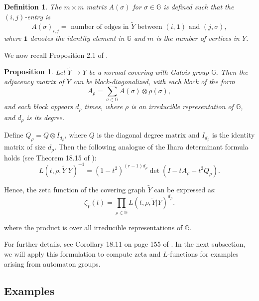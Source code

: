 \documentclass{article}
\newtheorem{mydef}{Definition}[section]
\newtheorem{mypro}{Proposition}[section]
\newcommand{\gid}{\mathbf{1}}
\newcommand{\Gal}{\mathbb{G}}
\newcommand{\Y}{\widetilde{Y}}
\begin{document}
\medskip
\begin{mydef} The $m \times m$ matrix $A(\sigma)$ for $\sigma \in \Gal$ is defined such that the $(i,j)$-entry is
\begin{equation}
A(\sigma)_{i,j} = \text{ number of edges in } \Y \text{ between } (i, \gid) \text{ and } (j, \sigma),
\label{Equation:sheet1toandother}
\end{equation}
where $\gid$ denotes the identity element in $\Gal$ and $m$ is the number of vertices in $Y$. \end{mydef}

\medskip
We now recall Proposition 2.1 of \cite{dedeo2005zeta}.

\begin{mypro} \label{block-diagonalization} Let $\Y \to Y$ be a normal covering with Galois group $\Gal$. Then the adjacency matrix of $\Y$ can be block-diagonalized, with each block of the form
\begin{equation}
A_{\rho} = \sum_{\sigma \in \Gal} A(\sigma) \otimes \rho(\sigma),
\label{Equation:blockdiagonal}
\end{equation}
and each block appears $d_{\rho}$ times, where $\rho$ is an irreducible representation of $\Gal$, and $d_{\rho}$ is its degree.\end{mypro}
\medskip
Define $Q_{\rho} = Q \otimes I_{d_{\rho}}$, where $Q$ is the diagonal degree matrix and $I_{d_{\rho}}$ is the identity matrix of size $d_{\rho}$. Then the following analogue of the Ihara determinant formula holds (see Theorem 18.15 of \cite{terras2010zeta}):
$$
L(t,\rho,\Y|Y)^{-1} = (1 - t^2)^{(r - 1)d_{\rho}} \det(I - t A_{\rho} + t^2 Q_{\rho}).
$$

Hence, the zeta function of the covering graph $\Y$ can be expressed as:
\begin{equation}
\label{Equation:zetaasL}
\zeta_{\Y}(t) = \prod_{\rho \in \widehat{\Gal}}  L(t, \rho, \Y|Y)^{d_{\rho}}.
\end{equation}

where the product is over all irreducible representations of $\Gal$.

\medskip
For further details, see Corollary 18.11 on page 155 of \cite{terras2010zeta}. In the next subsection, we will apply this formulation to compute zeta and $L$-functions for examples arising from automaton groups.

\subsection{Examples}
\end{document}
